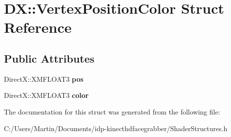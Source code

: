 \hypertarget{struct_d_x_1_1_vertex_position_color}{}\section{D\+X\+:\+:Vertex\+Position\+Color Struct Reference}
\label{struct_d_x_1_1_vertex_position_color}
\subsection*{Public Attributes}
\begin{DoxyCompactItemize}
\item 
\hypertarget{struct_d_x_1_1_vertex_position_color_adf1257e9c59254631b4d279d8b087695}{}Direct\+X\+::\+X\+M\+F\+L\+O\+A\+T3 {\bfseries pos}\label{struct_d_x_1_1_vertex_position_color_adf1257e9c59254631b4d279d8b087695}

\item 
\hypertarget{struct_d_x_1_1_vertex_position_color_aa9c49a8b15414798dffd30c911603389}{}Direct\+X\+::\+X\+M\+F\+L\+O\+A\+T3 {\bfseries color}\label{struct_d_x_1_1_vertex_position_color_aa9c49a8b15414798dffd30c911603389}

\end{DoxyCompactItemize}


The documentation for this struct was generated from the following file\+:\begin{DoxyCompactItemize}
\item 
C\+:/\+Users/\+Martin/\+Documents/idp-\/kinecthdfacegrabber/Shader\+Structures.\+h\end{DoxyCompactItemize}
